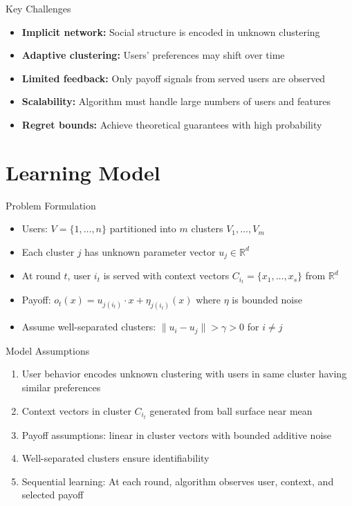 \documentclass[11pt]{beamer}
\begin{document}
\begin{frame}{Key Challenges}
  \begin{itemize}
    \item \textbf{Implicit network:} Social structure is encoded in unknown clustering
    \item \textbf{Adaptive clustering:} Users' preferences may shift over time
    \item \textbf{Limited feedback:} Only payoff signals from served users are observed
    \item \textbf{Scalability:} Algorithm must handle large numbers of users and features
    \item \textbf{Regret bounds:} Achieve theoretical guarantees with high probability
  \end{itemize}
\end{frame}

\section{Learning Model}

\begin{frame}{Problem Formulation}
  \begin{itemize}
    \item Users: $V = \{1, \ldots, n\}$ partitioned into $m$ clusters $V_1, \ldots, V_m$
    \item Each cluster $j$ has unknown parameter vector $u_j \in \mathbb{R}^d$
    \item At round $t$, user $i_t$ is served with context vectors $C_{i_t} = \{x_1, \ldots, x_s\}$ from $\mathbb{R}^d$
    \item Payoff: $o_t(x) = u_{j(i_t)} \cdot x + \eta_{j(i_t)}(x)$ where $\eta$ is bounded noise
    \item Assume well-separated clusters: $\|u_i - u_j\| > \gamma > 0$ for $i \neq j$
  \end{itemize}
\end{frame}

\begin{frame}{Model Assumptions}
  \begin{enumerate}
    \item User behavior encodes unknown clustering with users in same cluster having similar preferences
    \item Context vectors in cluster $C_{i_t}$ generated from ball surface near mean
    \item Payoff assumptions: linear in cluster vectors with bounded additive noise
    \item Well-separated clusters ensure identifiability
    \item Sequential learning: At each round, algorithm observes user, context, and selected payoff
  \end{enumerate}
\end{frame}
\end{document}
